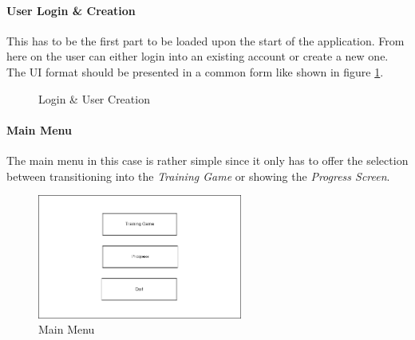 \documentclass[a4paper,11pt]{article}%
\renewcommand{\\}{\vspace*{0.5\baselineskip} \newline}
\begin{document}
\paragraph{User Login \& Creation} This has to be the first part to be loaded upon the start of the application. From here on the user can either login into an existing account or create a new one. The \acs{UI} format should be presented in a common form like shown in figure \ref{fig:userlogin}.
\begin{figure}[h!]
	\hspace{0.05\textwidth}
\caption{Login \& User Creation}
\label{fig:userlogin}
\vspace{3mm}
\end{figure}

\paragraph{Main Menu} The main menu in this case is rather simple since it only has to offer the selection between transitioning into the \textit{Training Game} or showing the \textit{Progress Screen}. 
\vspace{5mm}
\begin{figure}[h!]
\centering
\includegraphics[width=0.6\textwidth]{MainMenu.png}
\caption{Main Menu}
\label{fig:mainmenu}
\vspace{3mm}
\end{figure}
\end{document}
